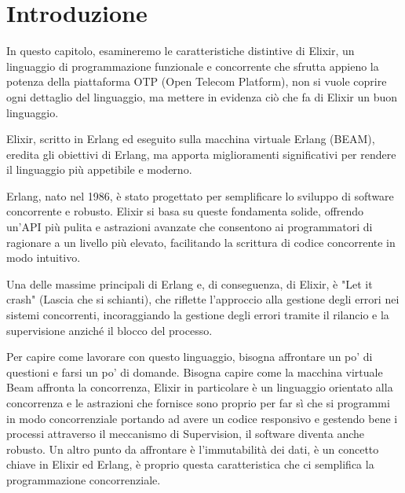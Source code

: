 \section{Introduzione}



In questo capitolo, esamineremo le caratteristiche distintive
di Elixir, un linguaggio di programmazione funzionale e
concorrente che sfrutta appieno la potenza della piattaforma
OTP (Open Telecom Platform), non si vuole coprire ogni dettaglio
del linguaggio, ma mettere in evidenza ciò che fa di Elixir
un buon linguaggio.

Elixir, scritto in Erlang ed eseguito sulla macchina virtuale
Erlang (BEAM), eredita gli obiettivi di Erlang, ma apporta
miglioramenti significativi per rendere il linguaggio più
appetibile e moderno.

Erlang, nato nel 1986, è stato progettato per semplificare
lo sviluppo di software concorrente e robusto.
Elixir si basa su queste fondamenta solide, offrendo un'API
più pulita e astrazioni avanzate che consentono ai programmatori
di ragionare a un livello più elevato, facilitando la scrittura
di codice concorrente in modo intuitivo.

Una delle massime principali di Erlang e, di conseguenza,
di Elixir, è "Let it crash" (Lascia che si schianti),
che riflette l'approccio alla gestione degli errori nei sistemi
concorrenti, incoraggiando la gestione degli errori tramite
il rilancio e la supervisione anziché il blocco del processo.

Per capire come lavorare con questo linguaggio, bisogna affrontare
un po' di questioni e farsi un po' di domande.
Bisogna capire come la macchina virtuale Beam affronta la concorrenza,
Elixir in particolare è un linguaggio orientato alla concorrenza e 
le astrazioni che fornisce sono proprio per far sì che
si programmi in modo concorrenziale portando ad avere un
codice responsivo e gestendo bene i processi attraverso 
il meccanismo di Supervision, il software diventa anche robusto.
Un altro punto da affrontare è l'immutabilità dei dati, è un concetto
chiave in Elixir ed Erlang, è proprio questa caratteristica
che ci semplifica la programmazione concorrenziale.
